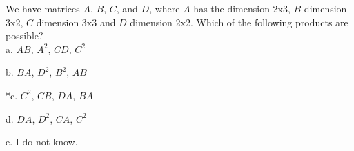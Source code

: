 
We have matrices $A$, $B$, $C$, and $D$, where $A$ has the dimension 2x3, $B$ dimension 3x2, $C$ dimension 3x3 and $D$ dimension 2x2. Which of the following products are possible?\\

a. $AB$, $A^{2}$, $CD$, $C^{2}$

b. $BA$, $D^{2}$, $B^{2}$, $AB$

*c. $C^{2}$, $CB$, $DA$, $BA$

d. $DA$, $D^{2}$, $CA$, $C^{2}$

e. I do not know.\\
